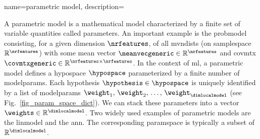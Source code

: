 {name={parametric model},
	description={A parametric \gls{model} is a mathematical \gls{model} characterized 
		by a finite set of variable quantities called \glspl{parameter}.
		An important example is the \gls{probmodel} consisting, for a given 
		\gls{dimension} $\nrfeatures$, of all \glspl{mvndist} (on \gls{samplespace} 
		$\mathbb{R}^{\nrfeatures}$) with some \gls{mean} \gls{vector} 
		$\meanvecgeneric \in \mathbb{R}^{\nrfeatures}$ and \gls{covmtx} $\covmtxgeneric \in \mathbb{R}^{\nrfeatures \times \nrfeatures}$.
        		In the context of \gls{ml}, a parametric \gls{model} defines a 
		\gls{hypospace} $\hypospace$ parameterized by a finite number of \glspl{modelparam}.
        		Each \gls{hypothesis} $\hypothesis \in \hypospace$ is uniquely identified by a 
		list of \glspl{modelparam} $\weight_{1}, \,\weight_{2}, \,\ldots, \,\weight_{\dimlocalmodel}$ 
		(see Fig.\ \ref{fig_param_space_dict}). We can stack these \glspl{parameter} into a 
		\gls{vector} $\weights \in \mathbb{R}^{\dimlocalmodel}$. Two widely used examples 
		of parametric \glspl{model} are the \gls{linmodel} and the \gls{ann}. The 
		corresponding \gls{paramspace} is typically a subset of $\mathbb{R}^{\dimlocalmodel}$.
		\begin{figure}[H]
			\begin{center}
\end{center}
\end{figure}}}
